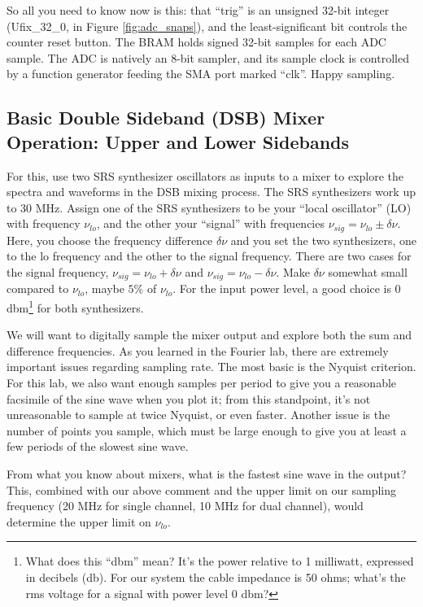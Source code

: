 \documentclass[11pt]{article}
\begin{document}
So all you need to know now is this: that ``trig'' is an unsigned 32-bit integer (Ufix\_32\_0, in
Figure \ref{fig:adc_snaps}), and the least-significant bit
controls the counter reset button.  The BRAM holds signed 32-bit samples for each ADC sample.  The
ADC is natively an 8-bit sampler, and its sample clock is controlled by a function generator feeding the
SMA port marked ``clk''.  Happy sampling.


\subsection{Basic Double Sideband (DSB) Mixer Operation: Upper and Lower Sidebands}
\label{upperlowerdsb}

        For this, use two SRS synthesizer oscillators as inputs to a
mixer to explore the spectra and waveforms in the DSB mixing process.
The SRS synthesizers work up to 30 MHz.  Assign one of the SRS
synthesizers to be your ``local oscillator'' (LO) with frequency
$\nu_{lo}$, and the other your ``signal'' with frequencies $\nu_{sig} =
\nu_{lo} \pm \delta \nu$.  Here, you choose the frequency difference
$\delta \nu$ and you set the two synthesizers, one to the lo
frequency and the other to the signal frequency. There are two cases for
the signal frequency, $\nu_{sig} = \nu_{lo} + \delta \nu$ and
$\nu_{sig} = \nu_{lo} - \delta \nu$.  Make $\delta \nu$ somewhat small
compared to $\nu_{lo}$, maybe $5\%$ of $\nu_{lo}$.  For the input power
level, a good choice is 0 dbm\footnote{What does this ``dbm'' mean? It's
the power relative to 1 milliwatt, expressed in decibels (db). For our
system the cable impedance is 50 ohms; what's the rms voltage for a
signal with power level 0 dbm?} for both synthesizers.

        We will want to digitally sample the mixer output and explore
both the sum and difference frequencies. As you learned in the Fourier
lab, there are extremely important issues regarding sampling rate. The
most basic is the Nyquist criterion. For this lab, we also want enough
samples per period to give you a reasonable facsimile of the sine wave
when you plot it; from this standpoint, it's not unreasonable to sample
at twice Nyquist, or even faster.  Another issue is the number of
points you sample, which must be large enough to give you at least a
few periods of the slowest sine wave.

        From what you know about mixers, what is the fastest sine wave
in the output? This, combined with our above comment and the upper limit
on our sampling frequency (20 MHz for single channel, 10 MHz for dual
channel), would determine the upper limit on $\nu_{lo}$.
\end{document}
